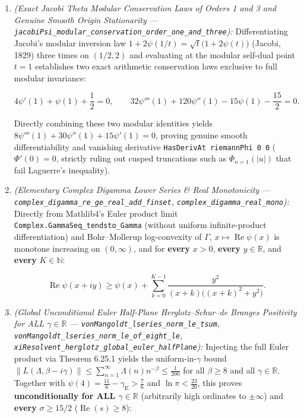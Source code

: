 \documentclass[
  11pt,
]{article}
\begin{document}
\begin{enumerate}
\def\labelenumi{\arabic{enumi}.}
\item
  \emph{(Exact Jacobi Theta Modular Conservation Laws of Orders 1 and 3
  and Genuine Smooth Origin Stationarity ---
  \texttt{jacobiPsi\_modular\_conservation\_order\_one\_and\_three}):}
  Differentiating Jacobi's modular inversion law
  \(1 + 2\psi(1/t) = \sqrt{t}\big(1 + 2\psi(t)\big)\) (Jacobi, 1829)
  three times on \((1/2, 2)\) and evaluating at the modular self-dual
  point \(t = 1\) establishes two exact arithmetic conservation laws
  exclusive to full modular invariance:

  \[4\psi'(1) + \psi(1) + \frac{1}{2} = 0, \qquad 32\psi'''(1) + 120\psi''(1) - 15\psi(1) - \frac{15}{2} = 0.\]

  Directly combining these two modular identities yields
  \(8\psi'''(1) + 30\psi''(1) + 15\psi'(1) = 0\), proving genuine smooth
  differentiability and vanishing derivative
  \texttt{HasDerivAt\ riemannPhi\ 0\ 0} (\(\Phi'(0) = 0\), strictly
  ruling out cusped truncations such as \(\Phi_{n=1}(|u|)\) that fail
  Laguerre's inequality).
\item
  \emph{(Elementary Complex Digamma Lower Series \& Real Monotonicity
  --- \texttt{complex\_digamma\_re\_ge\_real\_add\_finset},
  \texttt{complex\_digamma\_real\_mono}):} Directly from Mathlib4's
  Euler product limit \texttt{Complex.GammaSeq\_tendsto\_Gamma} (without
  uniform infinite-product differentiation) and Bohr--Mollerup
  log-convexity of \(\Gamma\), \(x \mapsto \operatorname{Re}\psi(x)\) is
  monotone increasing on \((0, \infty)\), and for \textbf{every}
  \(x > 0\), \textbf{every} \(y \in \mathbb{R}\), and \textbf{every}
  \(K \in \mathbb{N}\):

  \[\operatorname{Re}\psi(x + iy) \ge \psi(x) + \sum_{k=0}^{K-1} \frac{y^2}{(x + k)\big((x + k)^2 + y^2\big)}.\]
\item
  \emph{(Global Unconditional Euler Half-Plane Herglotz--Schur--de
  Branges Positivity for ALL \(\gamma \in \mathbb{R}\) ---
  \texttt{vonMangoldt\_lseries\_norm\_le\_tsum},
  \texttt{vonMangoldt\_lseries\_norm\_le\_of\_eight\_le},
  \texttt{xiResolvent\_herglotz\_global\_euler\_halfPlane}):} Injecting
  the full Euler product via Theorem 6.25.1 yields the
  uniform-in-\(\gamma\) bound
  \(\|L(\Lambda, \beta - i\gamma)\| \le \sum_{n=1}^\infty \Lambda(n)n^{-\beta} \le \frac{1}{200}\)
  for all \(\beta \ge 8\) and all \(\gamma \in \mathbb{R}\). Together
  with \(\psi(4) = \frac{11}{6} - \gamma_{\text{E}} > \frac{7}{6}\) and
  \(\ln\pi < \frac{23}{20}\), this proves \textbf{unconditionally for
  ALL \(\gamma \in \mathbb{R}\)} (arbitrarily high ordinates to
  \(\pm\infty\)) and \textbf{every} \(\sigma \ge 15/2\)
  (\(\operatorname{Re}(s) \ge 8\)):


\end{enumerate}
\end{document}
